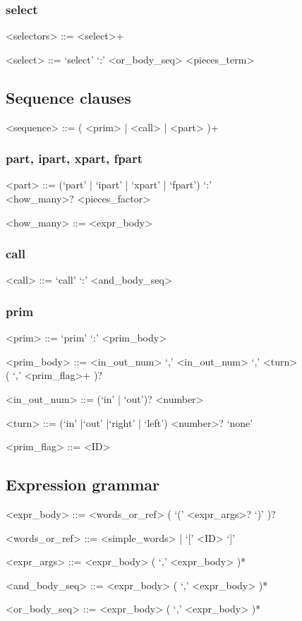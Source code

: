 \documentclass[12pt]{article}
\begin{document}
\subsubsection{select}
\begin{grammar}
<selectors> ::= <select>+

<select> ::= `select' `:' <or_body_seq> <pieces_term>
\end{grammar}

\subsection{Sequence clauses}
\begin{grammar}
<sequence> ::= ( <prim> | <call> | <part> )+
\end{grammar}

\subsubsection{part, ipart, xpart, fpart}
\begin{grammar}
<part> ::= (`part' | `ipart' | `xpart' | `fpart') `:' \\ <how_many>? <pieces_factor>

<how_many> ::= <expr_body>
\end{grammar}

\subsubsection{call}
\begin{grammar}
<call> ::= `call' `:' <and_body_seq>
\end{grammar}

\subsubsection{prim}
\begin{grammar}
<prim> ::= `prim' `:' <prim_body>

<prim_body> ::= <in_out_num> `,' <in_out_num> `,' <turn> \\ ( `,' <prim_flag>+ )?

<in_out_num> ::= (`in' | `out')? <number>

<turn> ::= (`in' |`out' |`right' | `left') <number>?
       \alt  `none'

<prim_flag> ::= <ID>
\end{grammar}

\subsection{Expression grammar}
\begin{grammar}
<expr_body> ::= <words_or_ref> ( `(' <expr_args>? `)' )?

<words_or_ref> ::= <simple_words> | `[' <ID> `]'

<expr_args> ::= <expr_body> ( `,' <expr_body> )*

<and_body_seq> ::= <expr_body> ( `,' <expr_body> )*

<or_body_seq> ::= <expr_body> ( `,' <expr_body> )*
\end{grammar}
\end{document}
